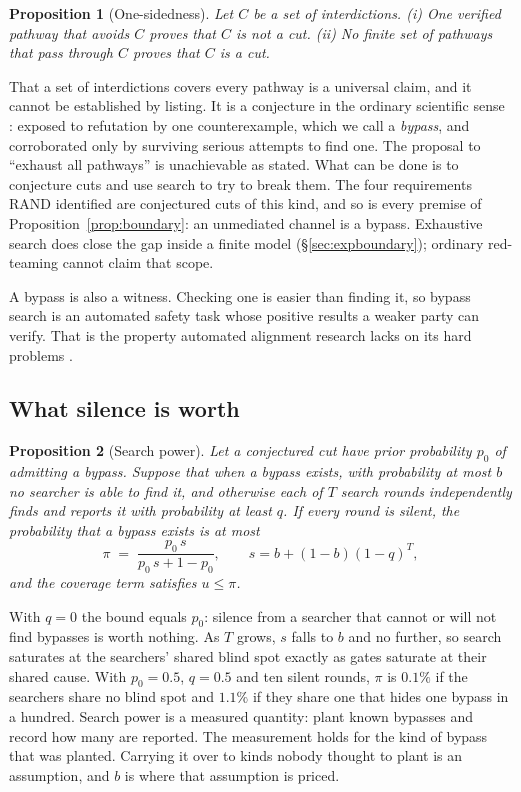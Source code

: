 \documentclass[10pt,twocolumn,letterpaper]{article}
\newtheorem{proposition}{Proposition}
\theoremstyle{definition}
\begin{document}
\begin{proposition}[One-sidedness]
\label{prop:onesided}
Let $C$ be a set of interdictions. (i) One verified pathway that avoids $C$ proves that $C$ is not a cut. (ii) No finite set of pathways that pass through $C$ proves that $C$ is a cut.
\end{proposition}

That a set of interdictions covers every pathway is a universal claim, and it cannot be established by listing. It is a conjecture in the ordinary scientific sense \cite{popper}: exposed to refutation by one counterexample, which we call a \emph{bypass}, and corroborated only by surviving serious attempts to find one. The proposal to ``exhaust all pathways'' is unachievable as stated. What can be done is to conjecture cuts and use search to try to break them. The four requirements RAND identified \cite{rand} are conjectured cuts of this kind, and so is every premise of Proposition~\ref{prop:boundary}: an unmediated channel is a bypass. Exhaustive search does close the gap inside a finite model (\S\ref{sec:expboundary}); ordinary red-teaming cannot claim that scope.

A bypass is also a witness. Checking one is easier than finding it, so bypass search is an automated safety task whose positive results a weaker party can verify. That is the property automated alignment research lacks on its hard problems \cite{bowkis}.

\subsection{What silence is worth}

\begin{proposition}[Search power]
\label{prop:power}
Let a conjectured cut have prior probability $p_{0}$ of admitting a bypass. Suppose that when a bypass exists, with probability at most $b$ no searcher is able to find it, and otherwise each of $T$ search rounds independently finds and reports it with probability at least $q$. If every round is silent, the probability that a bypass exists is at most
\[
\pi\;=\;\frac{p_{0}\,s}{p_{0}\,s+1-p_{0}},\qquad s=b+(1-b)(1-q)^{T},
\]
and the coverage term satisfies $u\le\pi$.
\end{proposition}

With $q=0$ the bound equals $p_{0}$: silence from a searcher that cannot or will not find bypasses is worth nothing. As $T$ grows, $s$ falls to $b$ and no further, so search saturates at the searchers' shared blind spot exactly as gates saturate at their shared cause. With $p_{0}=0.5$, $q=0.5$ and ten silent rounds, $\pi$ is $0.1\%$ if the searchers share no blind spot and $1.1\%$ if they share one that hides one bypass in a hundred. Search power is a measured quantity: plant known bypasses and record how many are reported. The measurement holds for the kind of bypass that was planted. Carrying it over to kinds nobody thought to plant is an assumption, and $b$ is where that assumption is priced.
\end{document}
